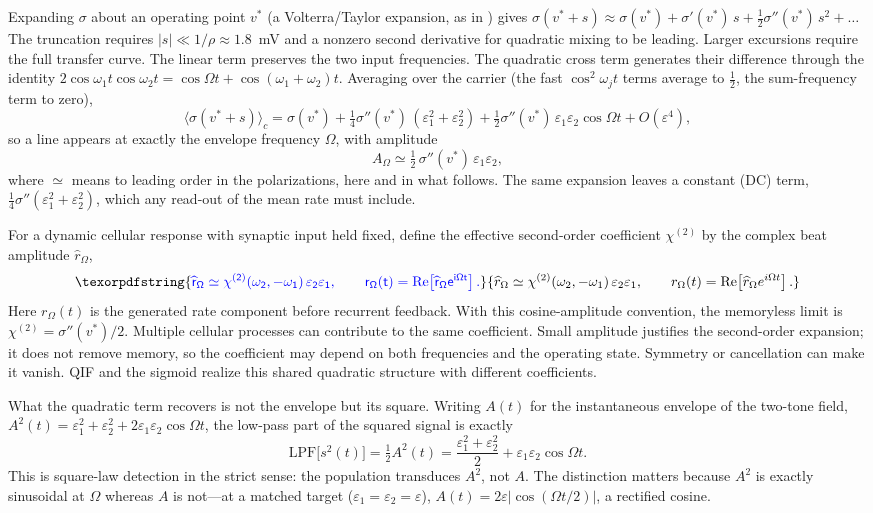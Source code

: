 \documentclass[11pt,a4paper]{article}
\newcommand{\Sig}{\sigma}
\newcommand{\half}{\tfrac{1}{2}}
\providecommand{\DIFaddtex}[1]{{\protect\color{blue} \sf #1}} %
\providecommand{\DIFaddbegin}{} %
\providecommand{\DIFaddend}{} %
\providecommand{\DIFadd}[1]{\texorpdfstring{\DIFaddtex{#1}}{#1}} %
\begin{document}
Expanding $\Sig$ about an operating point $v^*$ (a Volterra/Taylor expansion, as
in \cite{ruffini2025ham}) gives
$\Sig(v^*+s)\approx\Sig(v^*)+\Sig'(v^*)\,s+\half\Sig''(v^*)\,s^2+\dots$
The truncation requires $|s|\ll1/\rho\approx1.8$~mV and a nonzero second derivative
for quadratic mixing to be leading. Larger excursions require the full transfer curve.
The linear term preserves the two input frequencies. The quadratic cross term
generates their difference through the identity
$2\cos\omega_1t\cos\omega_2t=\cos\Omega t+\cos(\omega_1+\omega_2)t$.
Averaging over the carrier (the fast
$\cos^2\omega_jt$ terms average to $\half$, the sum-frequency term to zero),
\begin{equation}
\big\langle\Sig(v^*+s)\big\rangle_c
=\Sig(v^*)+\tfrac14\Sig''(v^*)\,(\varepsilon_1^2+\varepsilon_2^2)
+\tfrac12\Sig''(v^*)\,\varepsilon_1\varepsilon_2\cos\Omega t+O(\varepsilon^4),
\label{eq:taylor}
\end{equation}
so a line appears at exactly the envelope frequency $\Omega$, with amplitude
\begin{equation}
A_\Omega\simeq\half\,\Sig''(v^*)\,\varepsilon_1\varepsilon_2 ,
\label{eq:demod}
\end{equation}
where $\simeq$ means to leading order in the polarizations, here and in what follows. The
same expansion leaves a constant (DC) term, $\tfrac14\Sig''(\varepsilon_1^2+\varepsilon_2^2)$,
which any read-out of the mean rate must include.

\DIFaddbegin \DIFadd{For a dynamic cellular response with synaptic input held fixed, define the
effective second-order coefficient $\chi^{(2)}$ by the complex beat amplitude
$\widehat r_\Omega$,
}\[
\DIFadd{\widehat r_\Omega\simeq\chi^{(2)}(\omega_2,-\omega_1)\,
\varepsilon_2\varepsilon_1,\qquad
r_\Omega(t)=\operatorname{Re}\!\left[\widehat r_\Omega e^{i\Omega t}\right].
}\]
\DIFadd{Here $r_\Omega(t)$ is the generated rate component before recurrent feedback.
With this cosine-amplitude convention, the memoryless limit is
$\chi^{(2)}=\Sig''(v^*)/2$. Multiple cellular processes can contribute to the same
coefficient. Small amplitude justifies the second-order expansion; it does not
remove memory, so the coefficient may depend on both frequencies and the
operating state. Symmetry or cancellation can make it vanish. QIF and the sigmoid
realize this shared quadratic structure with different coefficients.
}

\DIFaddend What the quadratic term recovers is not the envelope but its square. Writing $A(t)$ for
the instantaneous envelope of the two-tone field,
$A^2(t)=\varepsilon_1^2+\varepsilon_2^2+2\varepsilon_1\varepsilon_2\cos\Omega t$, the
low-pass part of the squared signal is exactly
\begin{equation}
\mathrm{LPF}\big[s^2(t)\big]=\half A^2(t)
=\frac{\varepsilon_1^2+\varepsilon_2^2}{2}+\varepsilon_1\varepsilon_2\cos\Omega t .
\label{eq:sqenv}
\end{equation}
This is square-law detection in the strict sense: the population transduces $A^2$, not
$A$. The distinction matters because $A^2$ is exactly sinusoidal at $\Omega$
whereas $A$ is not---at a matched target ($\varepsilon_1=\varepsilon_2=\varepsilon$),
$A(t)=2\varepsilon|\cos(\Omega t/2)|$, a rectified cosine.
\end{document}
